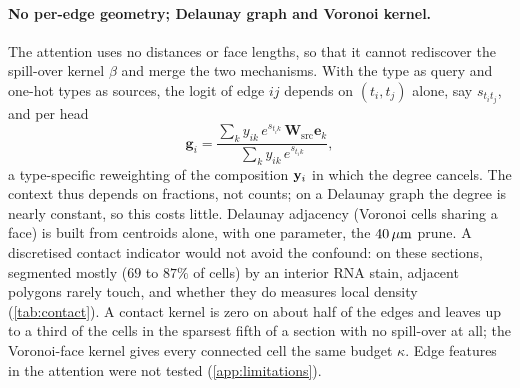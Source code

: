 \paragraph{No per-edge geometry; Delaunay graph and Voronoi kernel.}
\label{app:graph}
The attention uses no distances or face lengths, so that it cannot rediscover the spill-over kernel $\beta$ and merge the two mechanisms. With the type as query and one-hot types as sources, the logit of edge $ij$ depends on $(t_i, t_j)$ alone, say $s_{t_i t_j}$, and per head
\begin{equation}
  \mathbf{g}_i = \frac{\sum_k y_{ik}\, e^{s_{t_i k}}\, \mathbf{W}_{\mathrm{src}}\mathbf{e}_k}{\sum_k y_{ik}\, e^{s_{t_i k}}},
  \label{eq:context-closed}
\end{equation}
a type-specific reweighting of the composition $\mathbf{y}_i$ in which the degree cancels. The context thus depends on fractions, not counts; on a Delaunay graph the degree is nearly constant, so this costs little. Delaunay adjacency (Voronoi cells sharing a face) is built from centroids alone, with one parameter, the $40\,\mu\text{m}$ prune. A discretised contact indicator would not avoid the confound: on these sections, segmented mostly ($69$ to $87\%$ of cells) by an interior RNA stain, adjacent polygons rarely touch, and whether they do measures local density (\cref{tab:contact}). A contact kernel is zero on about half of the edges and leaves up to a third of the cells in the sparsest fifth of a section with no spill-over at all; the Voronoi-face kernel gives every connected cell the same budget $\kappa$. Edge features in the attention were not tested (\cref{app:limitations}).


